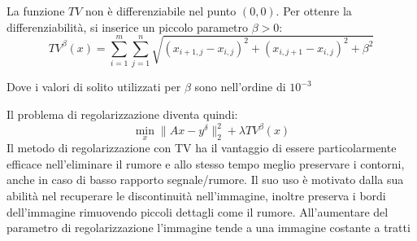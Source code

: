 La funzione $TV$ non è differenziabile nel punto $(0,0)$. Per ottenre la differenziabilità, si inserice un piccolo parametro $\beta > 0$:
\[
    TV^\beta(x) = \sum_{i=1}^{m}\sum_{j=1}^{n} \sqrt{(x_{i+1,j}- x_{i,j})^2 + (x_{i,j+1} - x_{i,j})^2 + \beta^2}
\]

Dove i valori di solito utilizzati per $\beta$ sono nell'ordine di $10^{-3}$

Il problema di regolarizzazione diventa quindi:
\[
    \min_x \|Ax-y^\delta\|_2^2 + \lambda TV ^ \beta(x)    
\]
Il metodo di regolarizzazione con TV ha il vantaggio di essere particolarmente efficace nell’eliminare il rumore e allo stesso tempo meglio preservare i contorni, anche in caso di basso rapporto segnale/rumore. Il suo uso è motivato dalla sua abilità nel recuperare le discontinuità nell’immagine, inoltre preserva i bordi dell’immagine rimuovendo piccoli dettagli come il rumore.
All’aumentare del parametro di regolarizzazione l’immagine tende a una immagine costante a tratti


